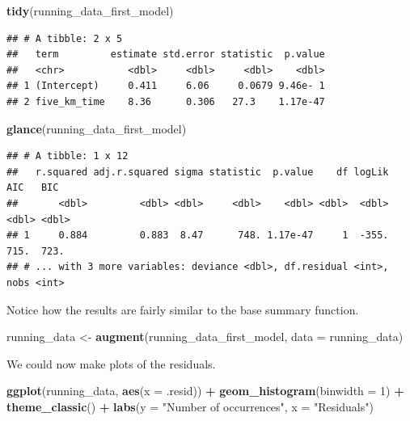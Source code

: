 \documentclass[
]{book}
\newenvironment{Shaded}{\begin{snugshade}}{\end{snugshade}}
\newcommand{\DataTypeTok}[1]{\textcolor[rgb]{0.13,0.29,0.53}{#1}}
\newcommand{\DecValTok}[1]{\textcolor[rgb]{0.00,0.00,0.81}{#1}}
\newcommand{\KeywordTok}[1]{\textcolor[rgb]{0.13,0.29,0.53}{\textbf{#1}}}
\newcommand{\NormalTok}[1]{#1}
\newcommand{\OperatorTok}[1]{\textcolor[rgb]{0.81,0.36,0.00}{\textbf{#1}}}
\newcommand{\StringTok}[1]{\textcolor[rgb]{0.31,0.60,0.02}{#1}}
\begin{document}
\begin{Shaded}
\begin{Highlighting}[]
\KeywordTok{tidy}\NormalTok{(running_data_first_model)}
\end{Highlighting}
\end{Shaded}

\begin{verbatim}
## # A tibble: 2 x 5
##   term         estimate std.error statistic  p.value
##   <chr>           <dbl>     <dbl>     <dbl>    <dbl>
## 1 (Intercept)     0.411     6.06     0.0679 9.46e- 1
## 2 five_km_time    8.36      0.306   27.3    1.17e-47
\end{verbatim}

\begin{Shaded}
\begin{Highlighting}[]
\KeywordTok{glance}\NormalTok{(running_data_first_model)}
\end{Highlighting}
\end{Shaded}

\begin{verbatim}
## # A tibble: 1 x 12
##   r.squared adj.r.squared sigma statistic  p.value    df logLik   AIC   BIC
##       <dbl>         <dbl> <dbl>     <dbl>    <dbl> <dbl>  <dbl> <dbl> <dbl>
## 1     0.884         0.883  8.47      748. 1.17e-47     1  -355.  715.  723.
## # ... with 3 more variables: deviance <dbl>, df.residual <int>, nobs <int>
\end{verbatim}

Notice how the results are fairly similar to the base summary function.

\begin{Shaded}
\begin{Highlighting}[]
\NormalTok{running_data <-}\StringTok{ }
\StringTok{  }\KeywordTok{augment}\NormalTok{(running_data_first_model,}
          \DataTypeTok{data =}\NormalTok{ running_data)}
\end{Highlighting}
\end{Shaded}

We could now make plots of the residuals.

\begin{Shaded}
\begin{Highlighting}[]
\KeywordTok{ggplot}\NormalTok{(running_data, }
       \KeywordTok{aes}\NormalTok{(}\DataTypeTok{x =}\NormalTok{ .resid)) }\OperatorTok{+}\StringTok{ }
\StringTok{  }\KeywordTok{geom_histogram}\NormalTok{(}\DataTypeTok{binwidth =} \DecValTok{1}\NormalTok{) }\OperatorTok{+}
\StringTok{  }\KeywordTok{theme_classic}\NormalTok{() }\OperatorTok{+}
\StringTok{  }\KeywordTok{labs}\NormalTok{(}\DataTypeTok{y =} \StringTok{"Number of occurrences"}\NormalTok{,}
       \DataTypeTok{x =} \StringTok{"Residuals"}\NormalTok{)}
\end{Highlighting}
\end{Shaded}
\end{document}
